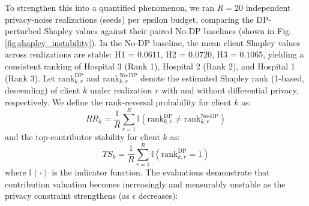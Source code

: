 \documentclass[conference]{IEEEtran}
\begin{document}
To strengthen this into a quantified phenomenon, we ran $R=20$ independent privacy-noise realizations (seeds) per epsilon budget, comparing the DP-perturbed Shapley values against their paired No-DP baselines (shown in Fig. \ref{fig:shapley_instability}). In the No-DP baseline, the mean client Shapley values across realizations are stable: H1 = $0.0611$, H2 = $0.0720$, H3 = $0.1065$, yielding a consistent ranking of Hospital 3 (Rank 1), Hospital 2 (Rank 2), and Hospital 1 (Rank 3). Let $\text{rank}_{k,r}^{\text{DP}}$ and $\text{rank}_{k,r}^{\text{No-DP}}$ denote the estimated Shapley rank (1-based, descending) of client $k$ under realization $r$ with and without differential privacy, respectively. We define the rank-reversal probability for client $k$ as:
\begin{equation}
RR_k = \frac{1}{R} \sum_{r=1}^R \mathbb{I}(\text{rank}_{k,r}^{\text{DP}} \neq \text{rank}_{k,r}^{\text{No-DP}})
\end{equation}
and the top-contributor stability for client $k$ as:
\begin{equation}
TS_k = \frac{1}{R} \sum_{r=1}^R \mathbb{I}(\text{rank}_{k,r}^{\text{DP}} = 1)
\end{equation}
where $\mathbb{I}(\cdot)$ is the indicator function. The evaluations demonstrate that contribution valuation becomes increasingly and measurably unstable as the privacy constraint strengthens (as $\epsilon$ decreases):
\end{document}
